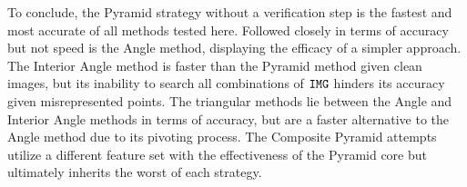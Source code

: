 To conclude, the Pyramid strategy without a verification step is the fastest and most accurate of all methods tested here.
Followed closely in terms of accuracy but not speed is the Angle method, displaying the efficacy of a simpler approach.
The Interior Angle method is faster than the Pyramid method given clean images, but its inability to search all combinations of $\texttt{IMG}$ hinders its accuracy given misrepresented points.
The triangular methods lie between the Angle and Interior Angle methods in terms of accuracy, but are a faster alternative to the Angle method due to its pivoting process.
The Composite Pyramid attempts utilize a different feature set with the effectiveness of the Pyramid core but ultimately inherits the worst of each strategy.


\begin{figure}
\end{figure}



